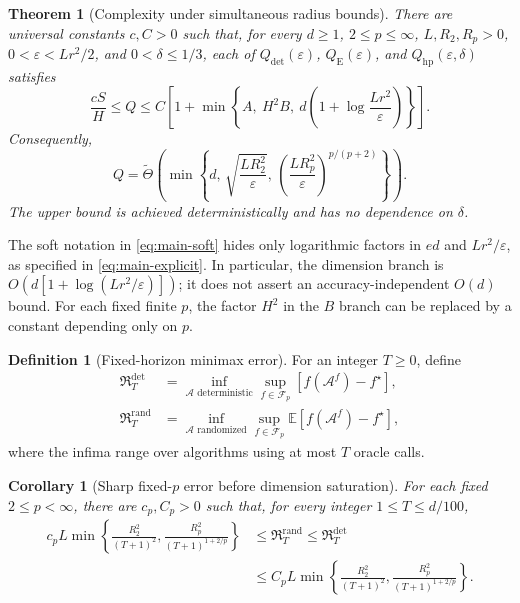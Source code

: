 \documentclass[11pt]{article}
\newcommand{\E}{\mathbb{E}}
\newcommand{\cF}{\mathcal{F}}
\newcommand{\cA}{\mathcal{A}}
\newcommand{\Risk}{\mathfrak{R}}
\newcommand{\Qdet}{Q_{\mathrm{det}}}
\newcommand{\Qexp}{Q_{\mathrm{E}}}
\newcommand{\Qhp}{Q_{\mathrm{hp}}}
\newcommand{\softTh}{\widetilde{\Theta}}
\newcommand{\eps}{\varepsilon}
\newtheorem{theorem}{Theorem}[section]
\newtheorem{corollary}[corollary]{Corollary}
\theoremstyle{definition}
\newtheorem{definition}[definition]{Definition}
\theoremstyle{remark}
\begin{document}
\begin{theorem}[Complexity under simultaneous radius bounds]
\label{thm:main}
There are universal constants $c,C>0$ such that, for every $d\ge1$,
$2\le p\le\infty$, $L,R_2,R_p>0$, $0<\eps<Lr^2/2$, and
$0<\delta\le1/3$, each of
$\Qdet(\eps)$, $\Qexp(\eps)$, and $\Qhp(\eps,\delta)$ satisfies
\begin{equation}
\label{eq:main-explicit}
 \frac{cS}{H}\le Q\le
 C\left[1+\min\left\{
 A,\ H^2 B,\ d\left(1+\log\frac{Lr^2}{\eps}\right)
 \right\}\right].
\end{equation}
Consequently,
\begin{equation}
\label{eq:main-soft}
 Q=\softTh\!\left(\min\left\{d,\,
 \sqrt{\frac{LR_2^2}{\eps}},\,
 \left(\frac{LR_p^2}{\eps}\right)^{p/(p+2)}\right\}\right).
\end{equation}
The upper bound is achieved deterministically and has no dependence on
$\delta$.
\end{theorem}

The soft notation in \cref{eq:main-soft} hides only logarithmic factors
in $ed$ and $Lr^2/\eps$, as specified in \cref{eq:main-explicit}.
In particular, the dimension branch is
$O(d[1+\log(Lr^2/\eps)])$; it does not assert an accuracy-independent
$O(d)$ bound. For each fixed finite $p$, the factor $H^2$ in the
$B$ branch can be replaced by a constant depending only on $p$.

\begin{definition}[Fixed-horizon minimax error]
\label{def:risks}
For an integer $T\ge0$, define
\begin{align*}
 \Risk_T^{\mathrm{det}}
 &=\inf_{\cA\text{ deterministic}}\sup_{f\in\cF_p}
       [f(\cA^f)-f^\star],\\
 \Risk_T^{\mathrm{rand}}
 &=\inf_{\cA\text{ randomized}}\sup_{f\in\cF_p}
       \E[f(\cA^f)-f^\star],
\end{align*}
where the infima range over algorithms using at most $T$ oracle calls.
\end{definition}

\begin{corollary}[Sharp fixed-$p$ error before dimension saturation]
\label{cor:risk}
For each fixed $2\le p<\infty$, there are $c_p,C_p>0$ such that, for
every integer $1\le T\le d/100$,
\begin{equation}
\label{eq:risk-rate}
\begin{split}
 c_p L\min\left\{\frac{R_2^2}{(T+1)^2},
                 \frac{R_p^2}{(T+1)^{1+2/p}}\right\}
 &\le\Risk_T^{\mathrm{rand}}\le\Risk_T^{\mathrm{det}}\\
 &\le C_p L\min\left\{\frac{R_2^2}{(T+1)^2},
                       \frac{R_p^2}{(T+1)^{1+2/p}}\right\}.
\end{split}
\end{equation}
\end{corollary}
\end{document}

